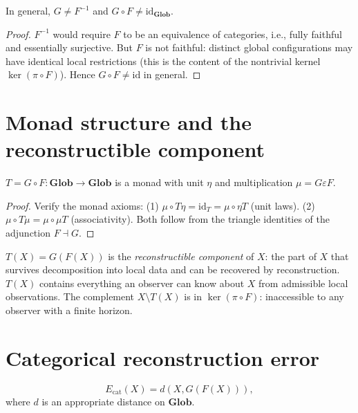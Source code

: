 \begin{proposition}
  \label{prop:not-inversion}
  \statusproven{}
  In general, $G \neq F^{-1}$ and $G \circ F \neq \mathrm{id}_{\mathbf{Glob}}$.
\end{proposition}

\begin{proof}
  $F^{-1}$ would require $F$ to be an equivalence of categories,
  i.e., fully faithful and essentially surjective.
  But $F$ is not faithful: distinct global configurations may
  have identical local restrictions (this is the content of
  the nontrivial kernel $\ker(\pi \circ F)$).
  Hence $G \circ F \neq \mathrm{id}$ in general.
\end{proof}

\section{Monad structure and the reconstructible component}

\begin{theorem}
  \label{thm:monad}
  \statusproven{}
  $T = G \circ F : \mathbf{Glob} \to \mathbf{Glob}$ is a monad
  with unit $\eta$ and multiplication $\mu = G\varepsilon F$.
\end{theorem}

\begin{proof}
  Verify the monad axioms:
  (1) $\mu \circ T\eta = \mathrm{id}_T = \mu \circ \eta T$
  (unit laws).
  (2) $\mu \circ T\mu = \mu \circ \mu T$ (associativity).
  Both follow from the triangle identities of the adjunction
  $F \dashv G$.
\end{proof}

\begin{InterpBox}
  $T(X) = G(F(X))$ is the \emph{reconstructible component} of $X$:
  the part of $X$ that survives decomposition into local data
  and can be recovered by reconstruction.
  $T(X)$ contains everything an observer can know about $X$
  from admissible local observations.
  The complement $X \setminus T(X)$ is in $\ker(\pi \circ F)$:
  inaccessible to any observer with a finite horizon.
\end{InterpBox}

\section{Categorical reconstruction error}

\begin{definition}
  \label{def:cat-recon-error}
  \[
    E_{\mathrm{cat}}(X) = d(X, G(F(X))),
  \]
  where $d$ is an appropriate distance on $\mathbf{Glob}$.
\end{definition}

